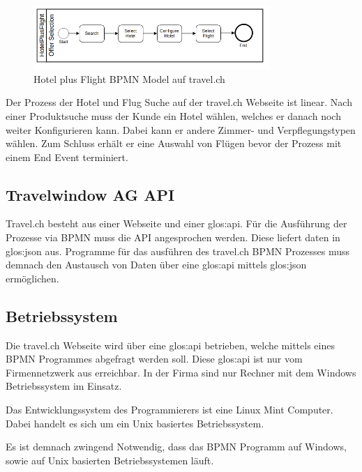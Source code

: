 \begin{figure}[H]
	\centering
	\includegraphics[width=0.8\textwidth]{images/hotelplusflight.png}
	\caption{Hotel plus Flight BPMN Model auf travel.ch}
	\label{fig:recherche:rahmenbedingungen:hotelplusflight}
\end{figure}
Der Prozess der Hotel und Flug Suche auf der travel.ch Webseite ist linear. Nach einer Produktsuche muss der Kunde ein Hotel wählen, welches er danach noch weiter Konfigurieren kann. Dabei kann er andere Zimmer- und Verpflegungstypen wählen. Zum Schluss erhält er eine Auswahl von Flügen bevor der Prozess mit einem End Event terminiert.

\subsection{Travelwindow AG API}
\label{sec:Recherche:rahmenbedingungen:api}
Travel.ch besteht aus einer Webseite und einer \Gls{glos:api}. Für die Ausführung der Prozesse via BPMN muss die API angesprochen werden. Diese liefert daten in \Gls{glos:json} aus. Programme für das ausführen des travel.ch BPMN Prozesses muss demnach den Austausch von Daten über eine \Gls{glos:api} mittels \Gls{glos:json} ermöglichen.

\subsection{Betriebssystem}
Die travel.ch Webseite wird über eine \Gls{glos:api} betrieben, welche mittels eines BPMN Programmes abgefragt werden soll. Diese \Gls{glos:api} ist nur vom Firmennetzwerk aus erreichbar. In der Firma sind nur Rechner mit dem Windows Betriebssystem im Einsatz.

Das Entwicklungssystem des Programmierers ist eine Linux Mint Computer. Dabei handelt es sich um ein Unix basiertes Betriebssystem.

Es ist demnach zwingend Notwendig, dass das BPMN Programm auf Windows, sowie auf Unix basierten Betriebssystemen läuft.


